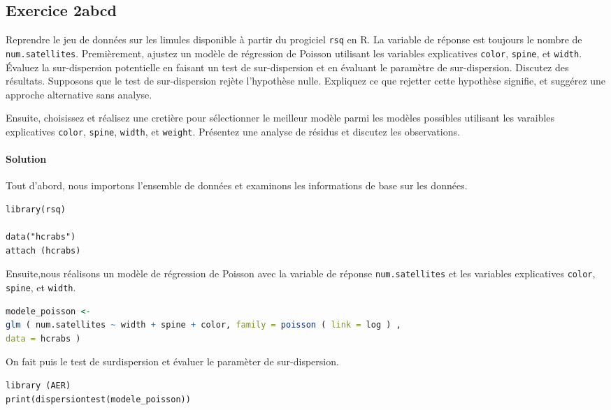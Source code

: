 \documentclass[../main.tex]{subfiles}
\begin{document}
\begin{CJK*}{UTF8}{gbsn}
\section*{Exercice 2abcd}
Reprendre le jeu de données sur les limules disponible à partir du progiciel \texttt{rsq}
en R. La variable de réponse est toujours le nombre de \texttt{num.satellites}.
Premièrement, ajustez un modèle de régression de Poisson utilisant les variables 
explicatives \texttt{color}, \texttt{spine}, et \texttt{width}. 
Évaluez la sur-dispersion potentielle en faisant un test de sur-dispersion et en évaluant le paramètre de
sur-dispersion. Discutez des résultats. Supposons que le test de sur-dispersion rejète l’hypothèse nulle. 
Expliquez ce que rejetter cette hypothèse signifie, et suggérez une approche alternative sans analyse.

Ensuite, choisissez et réalisez
une cretière pour sélectionner le meilleur modèle parmi les modèles possibles utilisant les varaibles explicatives 
\texttt{color}, \texttt{spine}, \texttt{width}, et \texttt{weight}. Présentez une analyse de résidus 
et discutez les observations. 

\paragraph{Solution}
Tout d'abord, nous importons l'ensemble de données et examinons les informations de base sur les données.

\begin{lstlisting}
library(rsq)

data("hcrabs")
attach (hcrabs)

\end{lstlisting}

Ensuite,nous réalisons 
un modèle de régression de Poisson avec la variable de réponse \texttt{num.satellites} 
et les variables explicatives \texttt{color}, \texttt{spine}, et \texttt{width}.

\begin{lstlisting}[language=R]
modele_poisson <- 
glm ( num.satellites ~ width + spine + color, family = poisson ( link = log ) ,
data = hcrabs ) 
\end{lstlisting}

On fait puis le test de surdispersion et évaluer le paramèter de sur-dispersion.

\begin{lstlisting}
library (AER)
print(dispersiontest(modele_poisson))
\end{lstlisting}


\end{CJK*}
\end{document}
